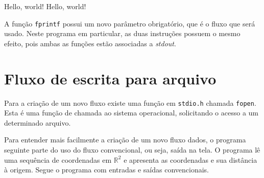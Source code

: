 \documentclass[
  11pt,
  a4paper,
]{scrbook}
\newenvironment{Shaded}{\begin{snugshade}}{\end{snugshade}}
\newcommand{\NormalTok}[1]{#1}
\begin{document}
\begin{Shaded}
\begin{Highlighting}[]
\NormalTok{Hello, world!}
\NormalTok{Hello, world!}
\end{Highlighting}
\end{Shaded}

A função \texttt{fprintf} possui um novo parâmetro obrigatório, que é o
fluxo que será usado. Neste programa em particular, as duas instruções
possuem o mesmo efeito, pois ambas as funções estão associadas a
\emph{stdout}.

\section{Fluxo de escrita para
arquivo}\label{fluxo-de-escrita-para-arquivo}

Para a criação de um novo fluxo existe uma função em \texttt{stdio.h}
chamada \texttt{fopen}. Esta é uma função de chamada ao sistema
operacional, solicitando o acesso a um determinado arquivo.

Para entender mais facilmente a criação de um novo fluxo dados, o
programa seguinte parte do uso do fluxo convencional, ou seja, saída na
tela. O programa lê uma sequência de coordenadas em \(\mathbb{R}^2\) e
apresenta as coordenadas e sua distância à origem. Segue o programa com
entradas e saídas convencionais.
\end{document}
